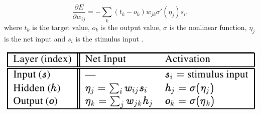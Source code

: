 $$\frac{\partial E}{\partial w_{ij}} = -\sum_k(t_k-o_k)w_{jk}\sigma'(\eta_j)s_i,$$
where $t_k$ is the target value, $o_k$ is the output value, $\sigma$ is the nonlinear function, $\eta_j$ is the net input and $s_i$ is the stimulus input \citet{o1996bio}.

\begin{center} 
\includegraphics{img/table_bp.png} 
\citet{farkas2013bal} 
\end{center} 
